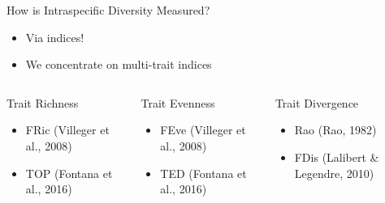 \documentclass[a4paper,9pt]{beamer}\usepackage[]{graphicx}\usepackage[]{color}
\begin{document}
\begin{frame}{How is Intraspecific Diversity Measured?}

\begin{itemize}
\item Via indices!
\item We concentrate on \alert{multi-trait indices}
\end{itemize}

\begin{columns}
\begin{column}{0.33\textwidth}

\begin{block}{Trait Richness}
\begin{itemize}
\item FRic (Villeger et al., 2008)
\item TOP (Fontana et al., 2016)
\end{itemize}
\end{block}

\end{column}

\begin{column}{0.33\textwidth}
\begin{block}{Trait Evenness}
\begin{itemize}
\item FEve (Villeger et al., 2008)
\item TED (Fontana et al., 2016)
\end{itemize}
\end{block}


\end{column}

\begin{column}{0.33\textwidth}
\begin{block}{Trait Divergence}
\begin{itemize}
\item Rao (Rao, 1982)
\item FDis (Lalibert \& Legendre, 2010)
\end{itemize}
\end{block}


\end{column}

\end{columns}

\end{frame}
\end{document}

